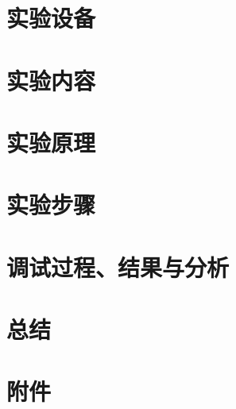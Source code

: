 \documentclass[a4paper,10pt,UTF8]{paper}
\numberwithin{equation}{section}
\numberwithin{figure}{section}
\begin{document}
\section{实验设备}


\section{实验内容}


\section{实验原理}

\section{实验步骤}

\section{调试过程、结果与分析}

\section{总结}

\section{附件}
\end{document}
